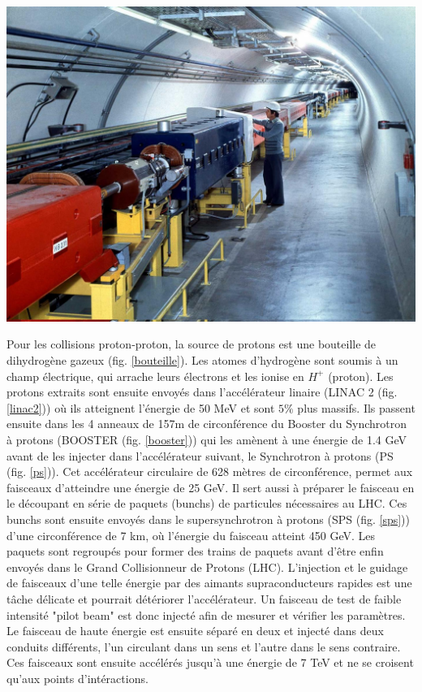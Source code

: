 \marginpar
{
	
	\includegraphics[width=\marginparwidth]{LHC/sps.jpg}
    	\label{sps}
}
Pour les collisions proton-proton, la source de protons est une bouteille de dihydrogène gazeux (fig. \ref{bouteille}). Les atomes d’hydrogène sont soumis à un champ électrique, qui arrache leurs électrons et les ionise en $H^{+}$ (proton). Les protons extraits sont ensuite envoyés dans l'accélérateur linaire (LINAC 2 (fig. \ref{linac2})) où ils atteignent l'énergie de 50 MeV et sont $5\%$ plus massifs. Ils passent ensuite dans les 4 anneaux de 157m de circonférence du Booster du Synchrotron à protons (BOOSTER (fig. \ref{booster})) qui les amènent à une énergie de 1.4 GeV avant de les injecter dans l'accélérateur suivant, le Synchrotron à protons (PS (fig. \ref{ps})). Cet accélérateur circulaire de 628 mètres de circonférence, permet aux faisceaux d'atteindre une énergie de 25 GeV. Il sert aussi à préparer le faisceau en le découpant en série de paquets (bunchs) de particules nécessaires au LHC. Ces bunchs sont ensuite envoyés dans le supersynchrotron à protons (SPS (fig. \ref{sps})) d'une circonférence de 7 km, où l'énergie du faisceau atteint 450 GeV. Les paquets sont regroupés pour former des trains de paquets avant d'être enfin envoyés dans le Grand Collisionneur de Protons (LHC). L'injection et le guidage de faisceaux d'une telle énergie par des aimants supraconducteurs rapides est une tâche délicate et pourrait détériorer l'accélérateur. Un faisceau de test de faible intensité "pilot beam" est donc injecté afin de mesurer et vérifier les paramètres. Le faisceau de haute énergie est ensuite séparé en deux et injecté dans deux conduits différents, l'un circulant dans un sens et l'autre dans le sens contraire. Ces faisceaux sont ensuite accélérés jusqu'à une énergie de 7 TeV et ne se croisent qu'aux points d'intéractions.


